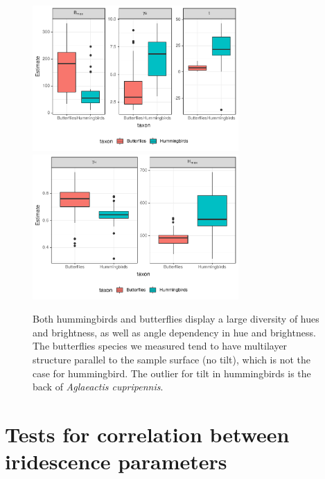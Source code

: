 \documentclass[a4]{article}
\begin{document}
    \begin{figure}[!h]
        \centering
        \includegraphics[width=0.7\textwidth]{boxplot_brightall}
        \includegraphics[width=0.7\textwidth]{boxplot_hueall}
        \caption{Both hummingbirds and butterflies display a large diversity of hues and brightness, as well as angle dependency in hue and brightness. The butterflies species we measured tend to have multilayer structure parallel to the sample surface (no tilt), which is not the case for hummingbird. The outlier for tilt in hummingbirds is the back of \textit{Aglaeactis cupripennis}.}
    \end{figure}
    
    \clearpage
    
    \section*{Tests for correlation between iridescence parameters}
    
\end{document}
